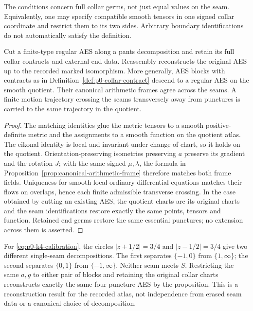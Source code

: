 The conditions concern full collar germs, not just equal values on the seam.
Equivalently, one may specify compatible smooth tensors in one signed collar
coordinate and restrict them to its two sides.  Arbitrary boundary
identifications do not automatically satisfy the definition.

\begin{proposition}
\label{prop:p0-aes-collar-descent}
Cut a finite-type regular AES along a pants decomposition and retain its full
collar contracts and external end data.  Reassembly reconstructs the original
AES up to the recorded marked isomorphism.  More generally, AES blocks with
contracts as in Definition~\ref{def:p0-collar-contract} descend to a regular
AES on the smooth quotient.  Their canonical arithmetic frames agree across
the seams.  A finite motion trajectory crossing the seams transversely away
from punctures is carried to the same trajectory in the quotient.
\end{proposition}

\begin{proof}
The matching identities glue the metric tensors to a smooth positive-definite
metric and the assignments to a smooth function on the quotient atlas.  The
eikonal identity is local and invariant under change of chart, so it holds on
the quotient.  Orientation-preserving isometries preserving $a$ preserve its
gradient and the rotation $J$; with the same signed $\mu,\lambda$, the formula
in Proposition~\ref{prop:canonical-arithmetic-frame} therefore matches both
frame fields.  Uniqueness for smooth local ordinary differential equations
matches their flows on overlaps, hence each finite admissible transverse
crossing.  In the case obtained by cutting an existing AES, the quotient charts
are its original charts and the seam identifications restore exactly the same
points, tensors and function.  Retained end germs restore the same essential
punctures; no extension across them is asserted.
\end{proof}

For \eqref{eq:p0-k4-calibration}, the circles
$|z+1/2|=3/4$ and $|z-1/2|=3/4$ give two different single-seam decompositions.
The first separates $\{-1,0\}$ from $\{1,\infty\}$; the second separates
$\{0,1\}$ from $\{-1,\infty\}$.  Neither seam meets $S$.  Restricting the
same $a,g$ to either pair of blocks and retaining the original collar charts
reconstructs exactly the same four-puncture AES by the proposition.  This is a
reconstruction result for the recorded atlas, not independence from erased
seam data or a canonical choice of decomposition.

